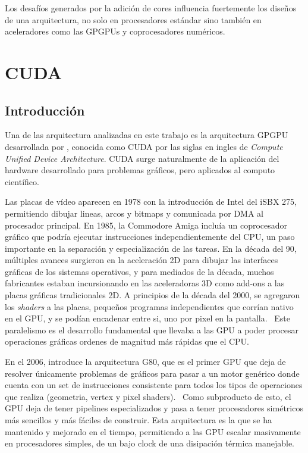 Los desaf\'ios generados por la adici\'on de cores influencia fuertemente los dise\~nos de una arquitectura, no solo en
procesadores est\'andar sino tambi\'en en aceleradores como las GPGPUs y coprocesadores num\'ericos.

\section{CUDA}

\subsection{Introducci\'on}

Una de las arquitectura analizadas en este trabajo es la arquitectura GPGPU desarrollada por \nvidia, conocida
como CUDA por las siglas en ingles de \textit{Compute Unified Device Architecture}.
CUDA surge naturalmente de la aplicaci\'on del hardware desarrollado para problemas gr\'aficos, pero aplicados al computo cient\'ifico.

Las placas de v\'ideo aparecen en 1978 con la introducci\'on de Intel del iSBX 275, permitiendo dibujar lineas,
arcos y bitmaps y comunicada por DMA al procesador principal. En 1985, la Commodore Amiga inclu\'ia un coprocesador
gr\'afico que podr\'ia ejecutar instrucciones independientemente del CPU, un paso importante en la separaci\'on
y especializaci\'on de las tareas. En la d\'ecada del 90, m\'ultiples
avances surgieron en la aceleraci\'on 2D para dibujar las interfaces gr\'aficas de los sistemas operativos,
y para mediados de la d\'ecada, muchos fabricantes estaban incursionando en las aceleradoras 3D como
add-ons a las placas gr\'aficas tradicionales 2D. A principios de la d\'ecada del 2000, se agregaron los
\textit{shaders} a las placas, peque\~nos programas independientes que corr\'ian nativo en el GPU,
y se pod\'ian encadenar entre si, uno por pixel en la pantalla.~\cite{CG} Este paralelismo es el desarrollo fundamental
que llevaba a las GPU a poder procesar operaciones gr\'aficas ordenes de magnitud m\'as r\'apidas que el CPU.

En el 2006, \nvidia  introduce la arquitectura G80,
que es el primer GPU que deja de resolver \'unicamente problemas de gr\'aficos
para pasar a un motor gen\'erico donde cuenta con un set de instrucciones consistente para todos los
tipos de operaciones que realiza (geometria, vertex y pixel shaders).~\cite{cudaHandbook} Como subproducto de esto,
el GPU deja de tener pipelines especializados y pasa a tener procesadores sim\'etricos m\'as sencillos y m\'as
f\'aciles de construir. Esta arquitectura es la que se ha mantenido y mejorado en el tiempo, permitiendo
a las GPU escalar masivamente en procesadores simples, de un bajo clock de una disipaci\'on t\'ermica
manejable.

